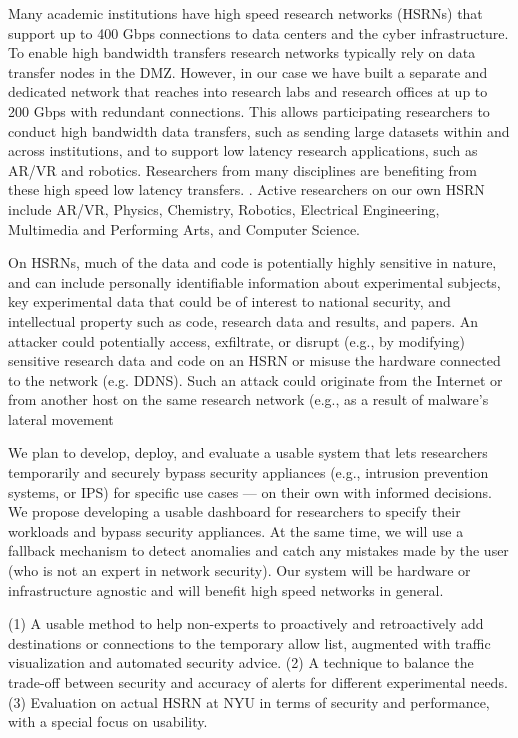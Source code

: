 \begin{center}
{\large \bf \TITLE}
\end{center}


Many academic institutions have high speed research networks (HSRNs) that support up to 400 Gbps connections to data centers and the cyber infrastructure. To enable high bandwidth transfers research networks typically rely on data transfer nodes in the DMZ. However, in our case we have built a separate and dedicated network that reaches into research labs and research offices at up to 200 Gbps with redundant connections. This allows participating researchers to conduct high bandwidth data transfers, such as sending large datasets within and across institutions, and to support  low latency research applications, such as AR/VR and robotics. Researchers from many disciplines are benefiting from these high speed low latency transfers. . Active researchers on our own HSRN include AR/VR, Physics, Chemistry, Robotics, Electrical Engineering, Multimedia and Performing Arts, and Computer Science.

On HSRNs, much of the data and code is potentially highly sensitive in nature, and can include personally identifiable information about experimental subjects, key experimental data that could be of interest to national security, and intellectual property such as code, research data and results, and papers.
An attacker could potentially access, exfiltrate, or disrupt (e.g., by modifying) sensitive research data and code on an HSRN or misuse the hardware connected to the network (e.g. DDNS). Such an  attack could originate from the Internet or from another host on the same research network (e.g., as a result of malware's lateral movement

We plan to develop, deploy, and evaluate a usable system that lets researchers temporarily and securely bypass security appliances (e.g., intrusion prevention systems, or IPS) for specific use cases — on their own with informed decisions. We propose developing a usable dashboard for researchers to specify their workloads and bypass security appliances. At the same time, we will use a fallback mechanism to detect anomalies and catch any mistakes made by the user (who is not an expert in network security). Our system will be hardware or infrastructure agnostic and will benefit high speed networks in general.


(1) A usable method to help non-experts to proactively and retroactively add destinations or connections to the temporary allow list, augmented with traffic visualization and automated security advice. (2) A technique to balance the trade-off between security and accuracy of alerts  for different experimental needs. (3) Evaluation on actual HSRN at NYU in terms of security and performance, with a special focus on usability.

